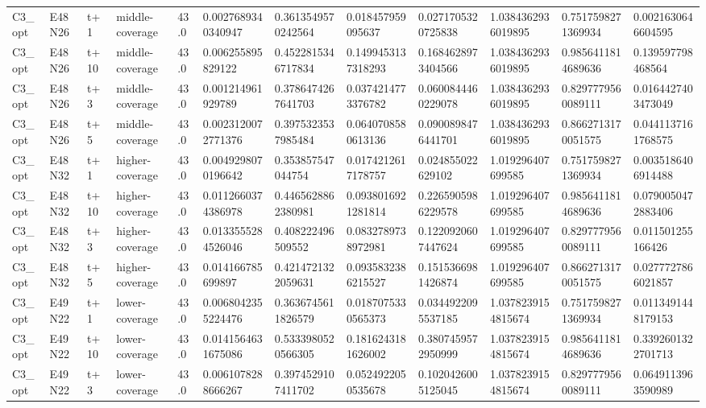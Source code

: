 \begin{landscape}
\begin{longtable}{llllllllllll}
C3\_opt & E48N26 & t+1 & middle-coverage & 43.0 & 0.0027689340340947 & 0.3613549570242564 & 0.018457959095637 & 0.0271705320725838 & 1.0384362936019895 & 0.7517598271369934 & 0.0021630646604595 \\
C3\_opt & E48N26 & t+10 & middle-coverage & 43.0 & 0.006255895829122 & 0.4522815346717834 & 0.1499453137318293 & 0.1684628973404566 & 1.0384362936019895 & 0.9856411814689636 & 0.139597798468564 \\
C3\_opt & E48N26 & t+3 & middle-coverage & 43.0 & 0.001214961929789 & 0.3786474267641703 & 0.0374214773376782 & 0.0600844460229078 & 1.0384362936019895 & 0.8297779560089111 & 0.0164427403473049 \\
C3\_opt & E48N26 & t+5 & middle-coverage & 43.0 & 0.0023120072771376 & 0.3975323537985484 & 0.0640708580613136 & 0.0900898476441701 & 1.0384362936019895 & 0.8662713170051575 & 0.0441137161768575 \\
C3\_opt & E48N32 & t+1 & higher-coverage & 43.0 & 0.0049298070196642 & 0.353857547044754 & 0.0174212617178757 & 0.024855022629102 & 1.019296407699585 & 0.7517598271369934 & 0.0035186406914488 \\
C3\_opt & E48N32 & t+10 & higher-coverage & 43.0 & 0.0112660374386978 & 0.4465628862380981 & 0.0938016921281814 & 0.2265905986229578 & 1.019296407699585 & 0.9856411814689636 & 0.0790050472883406 \\
C3\_opt & E48N32 & t+3 & higher-coverage & 43.0 & 0.0133555284526046 & 0.408222496509552 & 0.0832789738972981 & 0.1220920607447624 & 1.019296407699585 & 0.8297779560089111 & 0.011501255166426 \\
C3\_opt & E48N32 & t+5 & higher-coverage & 43.0 & 0.014166785699897 & 0.4214721322059631 & 0.0935832386215527 & 0.1515366981426874 & 1.019296407699585 & 0.8662713170051575 & 0.0277727866021857 \\
C3\_opt & E49N22 & t+1 & lower-coverage & 43.0 & 0.0068042355224476 & 0.3636745611826579 & 0.0187075330565373 & 0.0344922095537185 & 1.0378239154815674 & 0.7517598271369934 & 0.0113491448179153 \\
C3\_opt & E49N22 & t+10 & lower-coverage & 43.0 & 0.0141564631675086 & 0.5333980520566305 & 0.1816243181626002 & 0.3807459572950999 & 1.0378239154815674 & 0.9856411814689636 & 0.3392601322701713 \\
C3\_opt & E49N22 & t+3 & lower-coverage & 43.0 & 0.0061078288666267 & 0.3974529107411702 & 0.0524922050535678 & 0.1020426005125045 & 1.0378239154815674 & 0.8297779560089111 & 0.0649113963590989 \\

\end{longtable}
\end{landscape}
